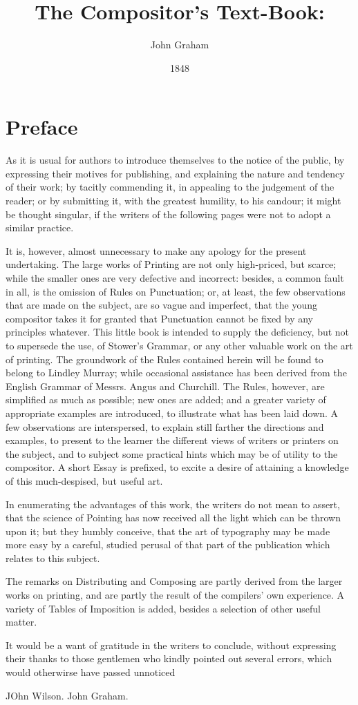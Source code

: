 \documentclass[twoside,letterpaper]{book}
\begin{document}
\title{The Compositor's Text-Book:}
\author{John Graham}
\date{1848}
\maketitle
\tableofcontents

{}
\section*{Preface}
As it is usual for authors to introduce themselves to the notice of the public,
by expressing their motives for publishing, and explaining the nature and
tendency of their work; by tacitly commending it, in appealing to the judgement
of the reader; or by submitting it, with the greatest humility, to his candour;
it might be thought singular, if the writers of the following pages were not to
adopt a similar practice.

It is, however, almost unnecessary to make any apology for the present
undertaking. The large works of Printing are not only high-priced, but scarce;
while the smaller ones are very defective and incorrect: besides, a common fault
in all, is the omission of Rules on Punctuation; or, at least, the few
observations that are made on the subject, are so vague and imperfect, that the
young compositor takes it for granted that Punctuation cannot be fixed by any
principles whatever. This little book is intended to supply the deficiency, but
not to supersede the use, of Stower's Grammar, or any other valuable work on the
art of printing. The groundwork of the Rules contained herein will be found to
belong to Lindley Murray; while occasional assistance has been derived from the
English Grammar of Messrs. Angus and Churchill. The Rules, however, are
simplified as much as possible; new ones are added; and a greater variety of
appropriate examples are introduced, to illustrate what has been laid down.
A few observations are interspersed, to explain still farther the directions and
examples, to present to the learner the different views of writers or printers
on the subject, and to subject some practical hints which may be of utility to
the compositor. A short Essay is prefixed, to excite a desire of attaining a
knowledge of this much-despised, but useful art.

In enumerating  the advantages of this work, the writers do not mean to assert,
that the science of Pointing has now received all the light which can be thrown
upon it; but they humbly conceive, that the art of typography may be made more
easy by a careful, studied perusal of that part of the publication which relates
to this subject.

The remarks on Distributing and Composing are partly derived from the larger
works on printing, and are partly the result of the compilers' own experience.
A variety of Tables of Imposition is added, besides a selection of other useful
matter.

It would be a want of gratitude in the writers to conclude, without expressing
their thanks to those gentlemen who kindly pointed out several errors, which would
otherwirse have passed unnoticed

JOhn Wilson.
John Graham.
\end{document}
